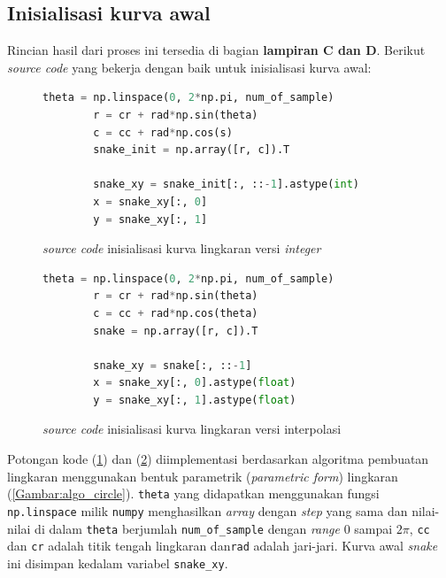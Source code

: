 \subsection{Inisialisasi kurva awal}
Rincian hasil dari proses ini tersedia di bagian \textbf{lampiran C dan D}. Berikut \emph{source code} yang bekerja dengan baik untuk inisialisasi kurva awal:
\begin{figure}[H]
	\begin{lstlisting}[language=Python, basicstyle=\tiny]
		theta = np.linspace(0, 2*np.pi, num_of_sample)
		r = cr + rad*np.sin(theta)
		c = cc + rad*np.cos(s)
		snake_init = np.array([r, c]).T
		
		snake_xy = snake_init[:, ::-1].astype(int)
		x = snake_xy[:, 0]
		y = snake_xy[:, 1]
	\end{lstlisting}
	\caption{\emph{source code} inisialisasi kurva lingkaran versi \emph{integer}}
	\label{Gambar:circle_integer}
\end{figure}
\begin{figure}[H]
	\begin{lstlisting}[language=Python, basicstyle=\tiny]
		theta = np.linspace(0, 2*np.pi, num_of_sample)
		r = cr + rad*np.sin(theta)
		c = cc + rad*np.cos(theta)
		snake = np.array([r, c]).T
		
		snake_xy = snake[:, ::-1]
		x = snake_xy[:, 0].astype(float)
		y = snake_xy[:, 1].astype(float)
	\end{lstlisting}
	\caption{\emph{source code} inisialisasi kurva lingkaran versi interpolasi}
	\label{Gambar:circle_float}
\end{figure}
Potongan kode (\ref{Gambar:circle_integer}) dan (\ref{Gambar:circle_float}) diimplementasi berdasarkan algoritma pembuatan lingkaran menggunakan bentuk parametrik (\emph{parametric form}) lingkaran (\ref{Gambar:algo_circle}). \texttt{theta} yang didapatkan menggunakan fungsi \texttt{np.linspace} milik \texttt{numpy} menghasilkan \emph{array} dengan \emph{step} yang sama dan nilai-nilai di dalam \texttt{theta} berjumlah \texttt{num\_of\_sample} dengan \emph{range} $0$ sampai $2 \pi$, \texttt{cc} dan \texttt{cr} adalah titik tengah lingkaran dan\texttt{rad} adalah jari-jari. Kurva awal \emph{snake} ini disimpan kedalam variabel \texttt{snake\_xy}.

